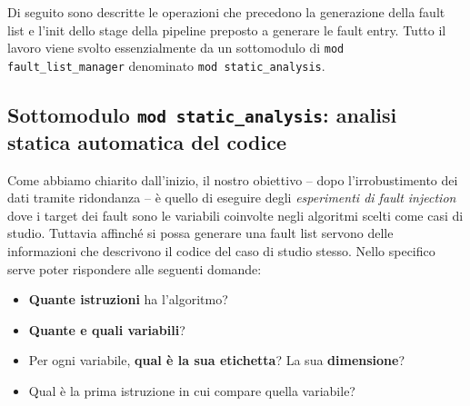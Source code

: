 \noindent Di seguito sono descritte le operazioni che precedono la generazione della fault list e l'init dello stage della pipeline preposto a generare le fault entry. Tutto il lavoro viene svolto essenzialmente da un sottomodulo di \texttt{mod fault\_list\_manager} denominato \texttt{mod static\_analysis}.
\subsection{Sottomodulo \texttt{mod static\_analysis}: analisi statica automatica del codice}
Come abbiamo chiarito dall'inizio, il nostro obiettivo -- dopo l'irrobustimento dei dati tramite ridondanza -- è quello di eseguire degli \textit{esperimenti di fault injection} dove i target dei fault sono le variabili coinvolte negli algoritmi scelti come casi di studio. Tuttavia affinché si possa generare una fault list servono delle informazioni che descrivono il codice del caso di studio stesso. Nello specifico serve poter rispondere alle seguenti domande: 
\begin{itemize}
    \itemsep-0.2em
    \item[\ding{52}] \textbf{Quante istruzioni} ha l'algoritmo?
    \item[\ding{52}] \textbf{Quante e quali variabili}?
    \item[\ding{52}] Per ogni variabile, \textbf{qual è la sua etichetta}? La sua \textbf{dimensione}? 
    \item[\ding{52}] Qual è la prima istruzione in cui compare quella variabile? 
\end{itemize}

